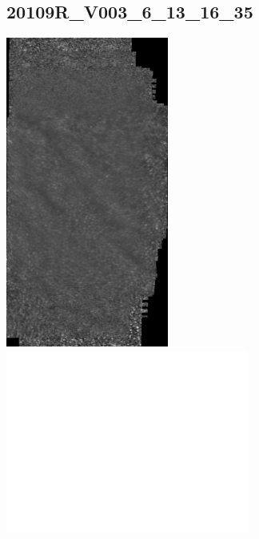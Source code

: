 \documentclass[11pt]{article}
\begin{document}
\subsection{20109R\_V003\_6\_13\_16\_35}
\includegraphics[width=0.40\textwidth, valign=m]{referenceframes/aoslo/20109R_V003_6_13_16_35_dwt_nostim_gamscaled_bandfilt_refframe.jpg}
\includegraphics[width=0.60\textwidth, valign=m]{eyepositiontraces/aoslo/20109R_V003_6_13_16_35.jpg}\\
\end{document}
